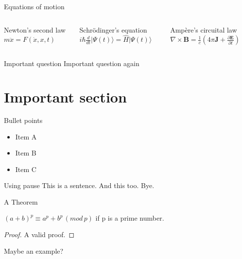 \documentclass{beamer}
\begin{document}
\begin{frame}{Equations of motion}

    \begin{columns}
        \begin{block}{Newton's second law}
            $m\ddot{x} = F(\dot{x}, x, t)$
        \end{block}
        \begin{block}{Schrödinger's equation}
            ${\displaystyle i\hbar {\frac {d}{dt}}\vert \Psi (t)\rangle ={\hat {H}}\vert \Psi (t)\rangle }$
        \end{block}
        \begin{block}{Ampère's circuital law}
            $ \nabla \times \mathbf{B}=\frac{1}{c}\left(4 \pi \mathbf{J}+\frac{\partial \mathbf{E}}{\partial t}\right)$
        \end{block}
    \end{columns}


\end{frame}
\begin{frame}{Important question}
    Important question again
\end{frame}
\section{Important section}
\begin{frame}{Bullet points}
    \begin{itemize}
        \item Item A
        \item Item B
        \item Item C
    \end{itemize}
\end{frame}
\begin{frame}{Using pause}
    This is a sentence. \pause
    And this too. \pause
    \alert{Bye}.
\end{frame}

\begin{frame}{A Theorem}
    \begin{theorem}
        $(a+b)^p \equiv a^p + b^p \, (mod \,p)$ if p is a prime number.
    \end{theorem} \pause
    \begin{proof}
        A valid proof.
    \end{proof}
    \begin{example}
        Maybe an example?
    \end{example}
\end{frame}
\end{document}
